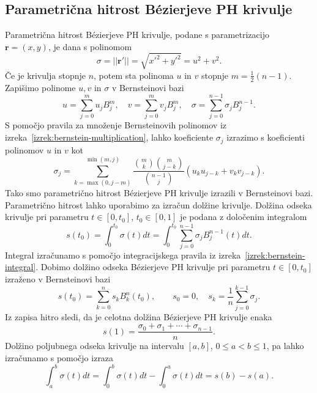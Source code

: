 \documentclass[isrm2, tisk]{fmfdelo}
\newcommand{\mycomment}[1]{\textbf{\textcolor{red}{#1}}}
\begin{document}
%
%
%
%

    \subsection{Parametrična hitrost Bézierjeve PH krivulje}\label{sec:param-hitrost-ph}
    Parametrična hitrost Bézierjeve PH krivulje, podane s parametrizacijo $\mathbf{r}=(x,y)$, je dana s polinomom
    \[\sigma = ||\mathbf{r}'|| = \sqrt{x'^2+y'^2} = u^2+v^2.\]
    Če je krivulja stopnje $n$, potem sta polinoma $u$ in $v$ stopnje $m=\frac{1}{2}(n-1)$.
    Zapišimo polinome $u,v$ in $\sigma$ v Bernsteinovi bazi \[u=\sum_{j=0}^{m}u_j B_{j}^{m}, \quad v=\sum_{j=0}^{m}v_j B_{j}^{m}, \quad \sigma=\sum_{j=0}^{n-1}\sigma_j B_j^{n-1}.\]
    S pomočjo pravila za množenje Bernsteinovih polinomov iz izreka~\ref{izrek:bernstein-multiplication}, lahko koeficiente $\sigma_j$ izrazimo s koeficienti polinomov $u$ in $v$ kot
    \[\sigma_j = \sum_{k=\max(0,j-m)}^{\min(m,j)} \frac{\binom{m}{k}\binom{m}{j-k}}{\binom{n-1}{j}}(u_k u_{j-k}+v_k v_{j-k}).\]
    Tako smo parametrično hitrost Bézierjeve PH krivulje izrazili v Bernsteinovi bazi.
    Parametrično hitrost lahko uporabimo za izračun dolžine krivulje.
    Dolžina odseka krivulje pri parametru $t \in [0,t_0]$, $t_0\in[0,1]$ je podana z določenim integralom
    \[s(t_0)=\int_0^{t_0}\sigma(t)dt = \int_0^{t_0}\sum_{j=0}^{n-1}\sigma_j B_j^{n-1}(t)dt.\]
    Integral izračunamo s pomočjo integracijskega pravila iz izreka~\ref{izrek:bernstein-integral}.
    Dobimo dolžino odseka Bézierjeve PH krivulje pri parametru $t \in [0,t_0]$ izraženo v Bernsteinovi bazi
    \[s(t_0)=\sum_{k=0}^n s_k B_k^{n}(t_0),\qquad s_0=0,\quad s_k = \frac{1}{n}\sum^{k-1}_{j=0}\sigma_j.\]
    Iz zapisa hitro sledi, da je celotna dolžina Bézierjeve PH krivulje enaka \[s(1)=\frac{\sigma_0+\sigma_1+\cdots+\sigma_{n-1}}{n}.\]
    Dolžino poljubnega odseka krivulje na intervalu $[a,b]$, $0\leq a < b\leq1$, pa lahko izračunamo s pomočjo izraza
    \[\int_a^b \sigma(t)dt = \int_0^b\sigma(t)dt - \int_0^a\sigma(t)dt = s(b)-s(a).\]
\end{document}
